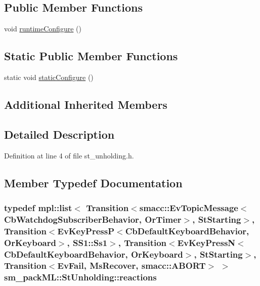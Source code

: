 \subsection*{Public Member Functions}
\begin{DoxyCompactItemize}
\item 
void \hyperlink{structsm__packML_1_1StUnholding_a2f5506132c1e20686a83fcbe4e3c3861}{runtime\+Configure} ()
\end{DoxyCompactItemize}
\subsection*{Static Public Member Functions}
\begin{DoxyCompactItemize}
\item 
static void \hyperlink{structsm__packML_1_1StUnholding_af10ed2a8a3468eeff32c4466544c7efa}{static\+Configure} ()
\end{DoxyCompactItemize}
\subsection*{Additional Inherited Members}


\subsection{Detailed Description}


Definition at line 4 of file st\+\_\+unholding.\+h.



\subsection{Member Typedef Documentation}
\subsubsection[{\texorpdfstring{reactions}{reactions}}]{\setlength{\rightskip}{0pt plus 5cm}typedef mpl\+::list$<$ Transition$<${\bf smacc\+::\+Ev\+Topic\+Message}$<${\bf Cb\+Watchdog\+Subscriber\+Behavior}, {\bf Or\+Timer}$>$, {\bf St\+Starting}$>$, Transition$<$Ev\+Key\+PressP$<$Cb\+Default\+Keyboard\+Behavior, {\bf Or\+Keyboard}$>$, {\bf S\+S1\+::\+Ss1}$>$, Transition$<$Ev\+Key\+PressN$<$Cb\+Default\+Keyboard\+Behavior, {\bf Or\+Keyboard}$>$, {\bf St\+Starting}$>$, Transition$<${\bf Ev\+Fail}, {\bf Ms\+Recover}, {\bf smacc\+::\+A\+B\+O\+RT}$>$ $>$ {\bf sm\+\_\+pack\+M\+L\+::\+St\+Unholding\+::reactions}}\hypertarget{structsm__packML_1_1StUnholding_a90f0e90d3ebd1463860870e58d49ce6f}{}\label{structsm__packML_1_1StUnholding_a90f0e90d3ebd1463860870e58d49ce6f}


